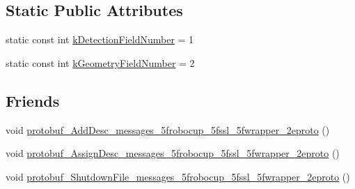 \subsection*{Static Public Attributes}
\begin{DoxyCompactItemize}
\item 
static const int \hyperlink{class_s_s_l___wrapper_packet_a9c14f49b731762618cbbba370ca4f38a}{k\-Detection\-Field\-Number} = 1
\item 
static const int \hyperlink{class_s_s_l___wrapper_packet_a6c9b43e30c9ee8f945cc3d958f62766e}{k\-Geometry\-Field\-Number} = 2
\end{DoxyCompactItemize}
\subsection*{Friends}
\begin{DoxyCompactItemize}
\item 
void \hyperlink{class_s_s_l___wrapper_packet_ae990911a18f4fd8ea29b42a6e68885a2}{protobuf\-\_\-\-Add\-Desc\-\_\-messages\-\_\-5frobocup\-\_\-5fssl\-\_\-5fwrapper\-\_\-2eproto} ()
\item 
void \hyperlink{class_s_s_l___wrapper_packet_ad01f1553127a8deed2eb5321d787c1e9}{protobuf\-\_\-\-Assign\-Desc\-\_\-messages\-\_\-5frobocup\-\_\-5fssl\-\_\-5fwrapper\-\_\-2eproto} ()
\item 
void \hyperlink{class_s_s_l___wrapper_packet_aae1bcf30a06bcd654b20902aef31ae26}{protobuf\-\_\-\-Shutdown\-File\-\_\-messages\-\_\-5frobocup\-\_\-5fssl\-\_\-5fwrapper\-\_\-2eproto} ()
\end{DoxyCompactItemize}


